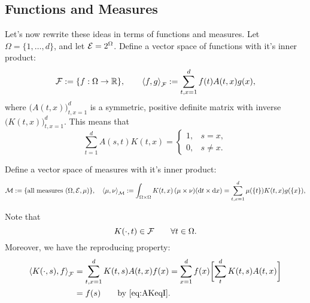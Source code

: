 \documentclass[reqno]{amsart}
\newcommand{\AGSNote}[1]{{\color{cyan} #1}}
\begin{document}
\subsection{Functions and Measures}
Let's now rewrite these ideas in terms of functions and measures.  Let $\Omega = \{1, \ldots, d\}$, and let $\ce = 2^\Omega$.  Define a vector space of functions with it's inner \AGSNote{product}:
\begin{equation*}
    \cf : = \{f : \Omega \to \reals\}, \qquad \ip[\cf]{f}{g} := \sum_{t,x=1}^d f(t) A(t,x) g(x),
\end{equation*}
where $\bigl( A(t,x) \bigr)_{t,x = 1}^d$ is a symmetric, positive definite matrix with inverse $\bigl( K(t,x) \bigr)_{t,x = 1}^d$.  This means that
\begin{equation} \label{eq:AKeqI}
    \sum_{t=1}^d A(s,t)K(t,x) = \begin{cases} 1, & s=x, \\ 0, & s\ne x. \end{cases}
\end{equation}

Define a vector space of measures with it's inner product:
\begin{equation*}
    \cm : = \{\text{all measures } (\Omega, \ce, \mu) \}, \quad 
    \ip[\cm]{\mu}{\nu} := \int_{\Omega \times \Omega} K(t,x) \, (\mu \times \nu) (\dif t \times \dif x) = \sum_{t,x=1}^d \mu(\{t\}) K(t,x) g(\{x\}),
\end{equation*}

Note that 
\[
K(\cdot,t) \in \cf \qquad \forall t \in \Omega.
\]
Moreover, we have the reproducing property:
\begin{align*}
\ip[\cf]{K(\cdot,s)}{f} &=  \sum_{t,x=1}^d K(t,s) A(t,x) f(x) 
= \sum_{x=1}^d f(x) \biggl[\sum_{t}^d K(t,s) A(t,x) \biggr] \\
& = f(s) \qquad \text{by \eqref{eq:AKeqI}}.
\end{align*}
\end{document}
